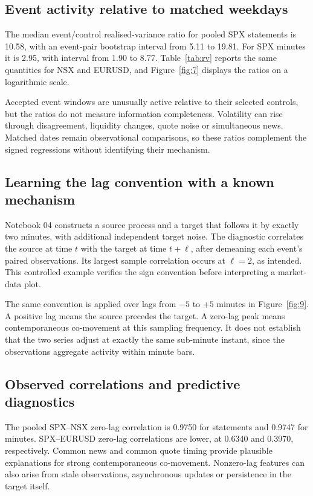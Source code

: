 \subsection{Event activity relative to matched weekdays}
The median event/control realised-variance ratio for pooled SPX statements is 10.58, with an event-pair bootstrap interval from 5.11 to 19.81. For SPX minutes it is 2.95, with interval from 1.90 to 8.77. Table~\ref{tab:rv} reports the same quantities for NSX and EURUSD, and Figure~\ref{fig:7} displays the ratios on a logarithmic scale.


Accepted event windows are unusually active relative to their selected controls, but the ratios do not measure information completeness. Volatility can rise through disagreement, liquidity changes, quote noise or simultaneous news. Matched dates remain observational comparisons, so these ratios complement the signed regressions without identifying their mechanism.

\label{sec:lag}
\subsection{Learning the lag convention with a known mechanism}
Notebook 04 constructs a source process and a target that follows it by exactly two minutes, with additional independent target noise. The diagnostic correlates the source at time $t$ with the target at time $t+\ell$, after demeaning each event's paired observations. Its largest sample correlation occurs at $\ell=2$, as intended. This controlled example verifies the sign convention before interpreting a market-data plot.

The same convention is applied over lags from $-5$ to $+5$ minutes in Figure~\ref{fig:9}. A positive lag means the source precedes the target. A zero-lag peak means contemporaneous co-movement at this sampling frequency. It does not establish that the two series adjust at exactly the same sub-minute instant, since the observations aggregate activity within minute bars.


\subsection{Observed correlations and predictive diagnostics}
The pooled SPX--NSX zero-lag correlation is 0.9750 for statements and 0.9747 for minutes. SPX--EURUSD zero-lag correlations are lower, at 0.6340 and 0.3970, respectively. Common news and common quote timing provide plausible explanations for strong contemporaneous co-movement. Nonzero-lag features can also arise from stale observations, asynchronous updates or persistence in the target itself.

